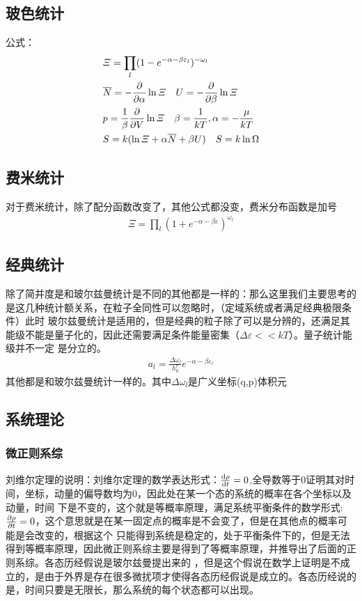 \documentclass[UTF8]{ctexart}
\begin{document}
\subsection{玻色统计}
公式：
\begin{align*}
         & \varXi = \prod _l (1-e^{-\alpha-\beta\varepsilon_l})^{-\omega_l}                     \\
         & \overline{N}=-\pdv{}{\alpha}\ln\varXi\quad U=-\pdv{}{\beta}\ln \varXi                \\
         & p=\frac{1}{\beta}\pdv{}{V}\ln \varXi \quad \beta=\frac{1}{kT},\alpha=-\frac{\mu}{kT} \\
         & S=k(\ln \varXi +\alpha\overline{N}+\beta U)\quad S=k\ln \Omega
\end{align*}
\subsection{费米统计}
对于费米统计，除了配分函数改变了，其他公式都没变，费米分布函数是加号
\begin{align*}
        \varXi = \prod_l(1+e^{-\alpha-\beta\varepsilon})^{\omega_l}
\end{align*}
\subsection{经典统计}
除了简并度是和玻尔兹曼统计是不同的其他都是一样的：那么这里我们主要思考的是这几种统计额关系，在粒子全同性可以忽略时，（定域系统或者满足经典极限条件）此时
玻尔兹曼统计是适用的，但是经典的粒子除了可以是分辨的，还满足其能级不能是量子化的，因此还需要满足条件能量密集（$\Delta \varepsilon << kT$）。量子统计能级并不一定
是分立的。
\begin{align*}
        a_l = \frac{\Delta \omega_l}{h_0^r} e^{-\alpha-\beta \varepsilon_l}
\end{align*}
其他都是和玻尔兹曼统计一样的。其中$\Delta \omega_l$是广义坐标(q,p)体积元
\subsection{系统理论}
\subsubsection{微正则系综}
刘维尔定理的说明：刘维尔定理的数学表达形式：$\dv{\rho}{t}=0$,全导数等于0证明其对时间，坐标，动量的偏导数均为0，因此处在某一个态的系统的概率在各个坐标以及动量，时间
下是不变的，这个就是等概率原理，满足系统平衡条件的数学形式:$\pdv{\rho}{t}=0$，这个意思就是在某一固定点的概率是不会变了，但是在其他点的概率可能是会改变的，根据这个
只能得到系统是稳定的，处于平衡条件下的，但是无法得到等概率原理，因此微正则系综主要是得到了等概率原理，并推导出了后面的正则系综。各态历经假说是玻尔兹曼提出来的
，但是这个假说在数学上证明是不成立的，是由于外界是存在很多微扰项才使得各态历经假说是成立的。各态历经说的是，时间只要是无限长，那么系统的每个状态都可以出现。
\end{document}
